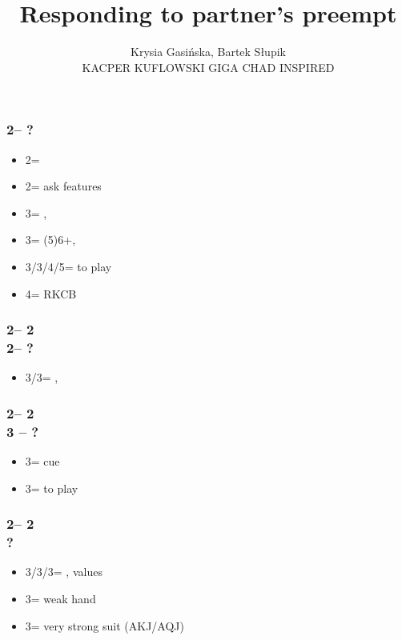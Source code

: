 \documentclass[12pt, a4paper]{article}
\title{Responding to partner's preempt}
\author{Krysia Gasińska, Bartek Słupik\\
        \textsc{KACPER KUFLOWSKI GIGA CHAD INSPIRED}}
\begin{document}
\maketitle


\subsubsection*{2\hearts -- ?}
\begin{itemize}
    \item 2\spades = \lsf
    \item 2\nt = ask \nt features
    \item 3\clubs = \minor, \gf
    \item 3\diams = (5)6+\spades, \invp \vimp
    \item 3\hearts/3\nt/4\major/5\minor = to play
    \item 4\clubs = RKCB
\end{itemize}

\subsubsection*{2\hearts -- 2\spades\\
                2\nt -- ?}
\begin{itemize}
    \item 3\clubs/3\diams = \nat, \inv
\end{itemize}

\subsubsection*{2\hearts -- 2\spades\\
                3 -- ?}
\begin{itemize}
    \item 3\spades = cue
    \item 3\nt = to play
\end{itemize}

\subsubsection*{2\hearts -- 2\nt\\
                ?}
\begin{itemize}
    \item 3\clubs/3\diams/3\spades = \nat, \nt values
    \item 3\hearts = weak hand
    \item 3\nt = very strong suit (AKJ/AQJ)
\end{itemize}
\end{document}
